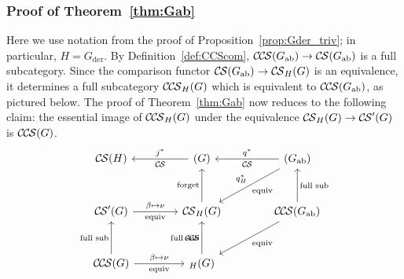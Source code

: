 \documentclass[10pt]{amsart}
\theoremstyle{plain}
\theoremstyle{definition}
\newcommand{\der}{_{\operatorname{der}}}
\newcommand{\ab}{_{\operatorname{ab}}}
\newcommand{\CS}{{\mathcal{C\hskip-0.8pt S}}}
\newcommand{\CCS}{{\mathcal{C\hskip-.8pt C\hskip-0.8pt S}}}
\begin{document}
\subsubsection{Proof of Theorem~\ref{thm:Gab}}\label{ssec:proof2}

Here we use notation from the proof of Proposition~\ref{prop:Gder_triv};
in particular, $H = G\der$.
By Definition~\ref{def:CCScom}, $\CCS(G\ab) \to \CS(G\ab)$ is a full subcategory.
Since the comparison functor $\CS(G\ab) \to \CS_{H}(G)$ is an equivalence, it determines a full subcategory $\CCS_{H}(G)$ which is equivalent to $\CCS(G\ab)$, as pictured below.
The proof of Theorem~\ref{thm:Gab} now reduces to the following claim: the essential image of $\CCS_H(G)$ under the equivalence $\CS_{H}(G) \to \CS'(G)$ is $\CCS(G)$.
\[
\begin{tikzcd}[row sep=30, column sep=40]
\CS(H) 
& \arrow{l}[swap]{j^*} \CS(G) 
&\arrow{l}[swap]{q^*} 
\CS(G\ab) \arrow{dl}{\text{equiv}}[swap]{q_{H}^*} \\
\CS'(G)  \arrow{r}{\beta \mapsto \nu}[swap]{\text{equiv}} 
&  \CS_{H}(G) \arrow{u}{\text{forget}}  
&  %
\CCS(G\ab) \arrow{u}[swap]{\text{full sub}} \arrow{dl}{\text{equiv}} \\
\CCS(G) \arrow{u}{\text{full sub}} \arrow{r}{\beta \mapsto \nu}[swap]{\text{equiv}}
& \arrow{u}{\text{full sub}}  \CCS_{H}(G) 
& 
\end{tikzcd}
\]
\end{document}

